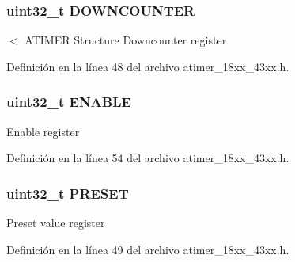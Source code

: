 \subsubsection[{\texorpdfstring{D\+O\+W\+N\+C\+O\+U\+N\+T\+ER}{DOWNCOUNTER}}]{ uint32\+\_\+t D\+O\+W\+N\+C\+O\+U\+N\+T\+ER}\hypertarget{struct_l_p_c___a_t_i_m_e_r___t_a48003e5438dd389da34f3775ae2d1737}{}\label{struct_l_p_c___a_t_i_m_e_r___t_a48003e5438dd389da34f3775ae2d1737}
$<$ A\+T\+I\+M\+ER Structure Downcounter register 

Definición en la línea 48 del archivo atimer\+\_\+18xx\+\_\+43xx.\+h.

\subsubsection[{\texorpdfstring{E\+N\+A\+B\+LE}{ENABLE}}]{ uint32\+\_\+t E\+N\+A\+B\+LE}\hypertarget{struct_l_p_c___a_t_i_m_e_r___t_a92c23e9b88593bf89218d85da0c67585}{}\label{struct_l_p_c___a_t_i_m_e_r___t_a92c23e9b88593bf89218d85da0c67585}
Enable register 

Definición en la línea 54 del archivo atimer\+\_\+18xx\+\_\+43xx.\+h.

\subsubsection[{\texorpdfstring{P\+R\+E\+S\+ET}{PRESET}}]{ uint32\+\_\+t P\+R\+E\+S\+ET}\hypertarget{struct_l_p_c___a_t_i_m_e_r___t_a0d1aa425e85140fab9caba063ae0b5fa}{}\label{struct_l_p_c___a_t_i_m_e_r___t_a0d1aa425e85140fab9caba063ae0b5fa}
Preset value register 

Definición en la línea 49 del archivo atimer\+\_\+18xx\+\_\+43xx.\+h.

